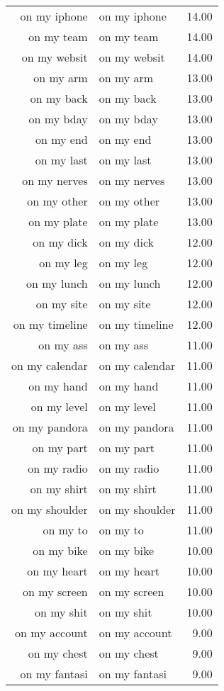 \begin{table}[ht]
\begin{tabular}{rlr}
  on my iphone & on my iphone & 14.00 \\ 
  on my team & on my team & 14.00 \\ 
  on my websit & on my websit & 14.00 \\ 
  on my arm & on my arm & 13.00 \\ 
  on my back & on my back & 13.00 \\ 
  on my bday & on my bday & 13.00 \\ 
  on my end & on my end & 13.00 \\ 
  on my last & on my last & 13.00 \\ 
  on my nerves & on my nerves & 13.00 \\ 
  on my other & on my other & 13.00 \\ 
  on my plate & on my plate & 13.00 \\ 
  on my dick & on my dick & 12.00 \\ 
  on my leg & on my leg & 12.00 \\ 
  on my lunch & on my lunch & 12.00 \\ 
  on my site & on my site & 12.00 \\ 
  on my timeline & on my timeline & 12.00 \\ 
  on my ass & on my ass & 11.00 \\ 
  on my calendar & on my calendar & 11.00 \\ 
  on my hand & on my hand & 11.00 \\ 
  on my level & on my level & 11.00 \\ 
  on my pandora & on my pandora & 11.00 \\ 
  on my part & on my part & 11.00 \\ 
  on my radio & on my radio & 11.00 \\ 
  on my shirt & on my shirt & 11.00 \\ 
  on my shoulder & on my shoulder & 11.00 \\ 
  on my to & on my to & 11.00 \\ 
  on my bike & on my bike & 10.00 \\ 
  on my heart & on my heart & 10.00 \\ 
  on my screen & on my screen & 10.00 \\ 
  on my shit & on my shit & 10.00 \\ 
  on my account & on my account & 9.00 \\ 
  on my chest & on my chest & 9.00 \\ 
  on my fantasi & on my fantasi & 9.00 \\ 

\end{tabular}
\end{table}

